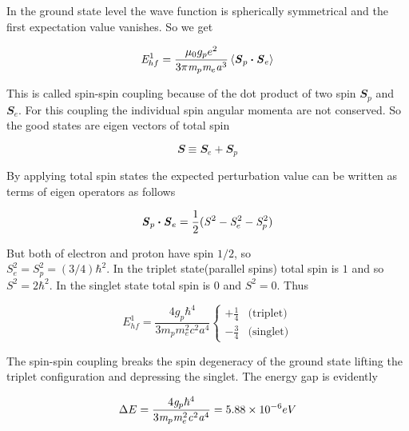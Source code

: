 \documentclass[fleqn,usenatbib]{mnras}
\begin{document}
In the ground state level the wave function is spherically symmetrical and the first expectation value vanishes. So we get

\begin{equation}
 \mathit{E}_{hf}^{1}=\frac{\mathit{\umu}_{0}g_{p}e^{2}}{3\upi\mathit{m}_{p}\mathit{m}_{e}\mathit{a}^{3}}\left\langle\mathbfit{S}_{p}\bmath{\cdot}\mathbfit{S}_{e}\right\rangle
\end{equation}

This is called spin-spin coupling because of the dot product of two spin $\mathbfit{S}_{p}$ and $\mathbfit{S}_{e}$. For this coupling the individual spin angular momenta are not conserved. So the good states are eigen vectors of total spin

\begin{equation}
 \mathbfit{S}\equiv\mathbfit{S}_{e}+\mathbfit{S}_{p}
\end{equation}

By applying total spin states the expected perturbation value can be written as terms of eigen operators as follows

\begin{equation}
  \mathbfit{S}_{p}\bmath{\cdot}\mathbfit{S}_{e}=\frac{1}{2}(\mathit{S}^{2}-\mathit{S}_{e}^{2}-\mathit{S}_{p}^{2})
 \end{equation}
 
But both of electron and proton have spin $1/2$, so\\ $\mathit{S}_{e}^{2}=\mathit{S}_{p}^{2}=(3/4)\mathit{\hbar}^{2}$. In the triplet state(parallel spins) total spin is $1$ and so $\mathit{S}^{2}=2\mathit{\hbar}^{2}$. In the singlet state total spin is $0$ and $\mathit{S}^{2}=0$. Thus

\begin{equation}
 \mathit{E}_{hf}^{1}=\frac{4\mathit{g}_{p}\mathit{\hbar}^{4}}{3\mathit{m}_{p}\mathit{m}_{e}^{2}\mathit{c}^{2}\mathit{a}^{4}}\begin{cases}
 +\frac{1}{4}& \text{(triplet)}\\
 -\frac{3}{4}& \text{(singlet)}
\end{cases} 
\end{equation}

The spin-spin coupling breaks the spin degeneracy of the ground state lifting the triplet configuration and depressing the singlet. The energy gap is evidently

\begin{equation}
 \Delta\-E=\frac{4\mathit{g}_{p}\mathit{\hbar}^{4}}{3\mathit{m}_{p}\mathit{m}_{e}^{2}\mathit{c}^{2}\mathit{a}^{4}}=5.88\times10^{-6} eV
\end{equation}
\end{document}
